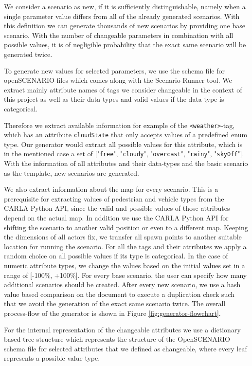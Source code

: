 \documentclass[conference, a4paper, 11pt]{IEEEtran}
\begin{document}
We consider a scenario as new, if it is sufficiently distinguishable, namely when a single parameter value differs from all of the already generated scenarios. With this definition we can generate thousands of new scenarios by providing one base scenario. With the number of changeable parameters in combination with all possible values, it is of negligible probability that the exact same scenario will be generated twice.

To generate new values for selected parameters, we use the schema file for openSCENARIO-files which comes along with the Scenario-Runner tool. We extract mainly attribute names of tags we consider changeable in the context of this project as well as their data-types and valid values if the data-type is categorical.

 Therefore we extract available information for example of the \texttt{<weather>}-tag, which has an attribute \texttt{cloudState} that only accepts values of a predefined enum type. Our generator would extract all possible values for this attribute,  which is in the mentioned case a set of ["\texttt{free}", "\texttt{cloudy}", "\texttt{overcast}", "\texttt{rainy}", "\texttt{skyOff}"]. With the information of all attributes and their data-types and the basic scenario as the template, new scenarios are generated. 
 
 We also extract information about the map for every scenario. This is a prerequisite for extracting values of pedestrian and vehicle types from the CARLA Python API, since the valid and possible values of those attributes depend on the actual map. In addition we use the CARLA Python API for shifting the scenario to another valid position or even to a different map. Keeping the dimensions of all actors fix, we transfer all spawn points to another suitable location for running the scenario.
 For all the tags and their attributes we apply a random choice on all possible values if its type is categorical. In the case of numeric attribute types, we change the values based on the initial values set in a range of [-100\%, +100\%].
 For every base scenario, the user can specify how many additional scenarios should be created. After every new scenario, we use a hash value based comparison on the document to execute a duplication check such that we avoid the generation of the exact same scenario twice.
The overall process-flow of the generator is shown in Figure \ref{fig:generator-flowchart}.

For the internal representation of the changeable attributes we use a dictionary based tree structure which represents the structure of the OpenSCENARIO schema file for selected attributes that we defined as changeable, where every leaf represents a possible value type.
\end{document}
